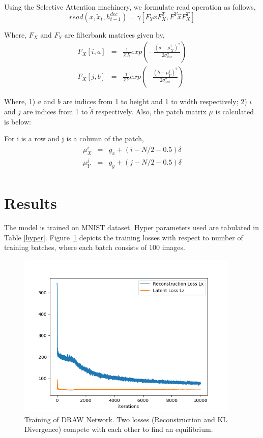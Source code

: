 \documentclass{scrartcl}
\begin{document}
Using the Selective Attention machinery, we formulate read operation as follows,
\begin{equation}
  read(x, \tilde{x}_t, h^{dec}_{t−1}) = \gamma [F_Y x F^T_X , F^Y \hat{x} F^T_X ]
\end{equation}

Where, $F_X$ and $F_Y$ are filterbank matrices given by,
\begin{eqnarray}
  F_X[i, a] &=& \frac{1}{ZX} exp( - \frac{{(a - \mu^i_X)}^2}{ 2\sigma_{var}^2}) \\
  F_X[j, b] &=& \frac{1}{ZY} exp( - \frac{{(b - \mu^j_Y)}^2}{ 2\sigma_{var}^2})
\end{eqnarray}

Where, 1) $a$ and $b$ are indices from 1 to height and 1 to width respectively;
2) $i$ and $j$ are indices from 1 to $\tilde{\delta}$ respectively.
Also, the patch matrix $\mu$ is calculated is below:

For i is a row and j is a column of the patch,
\begin{eqnarray}
  \mu^i_X &=& g_x + (i - N/2 - 0.5)\delta \\
  \mu^j_Y &=& g_y + (j - N/2 - 0.5)\delta \\
\end{eqnarray}

\section{Results}
  The model is trained on MNIST dataset. Hyper parameters used are tabulated in Table \ref{hyper}.
  Figure~\ref{train} depicts the training losses with respect to number of training batches, where each batch consists of 100 images.

\begin{figure}
\centering
  \includegraphics[width=300pt]{pre_loss.png}
  \caption{Training of DRAW Network. Two losses (Reconstruction and KL Divergence) compete with each other to find an equilibrium.}
\label{train}
\end{figure}
\end{document}
